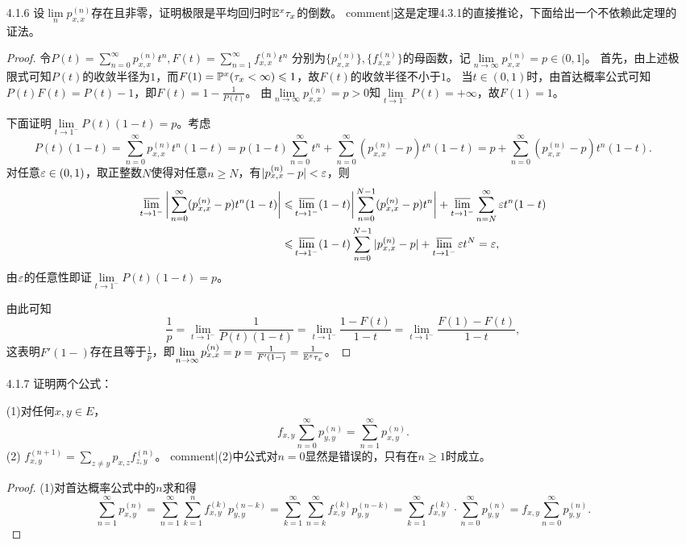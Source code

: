 \begin{enumerate}
\begin{proof}
        必要性：由$x$可达$y$知存在正整数$n$使得$p_{x,y}^{(n)}>0$，而首达概率公式表明
        $\sum\limits_{k=1}^n f_{x,y}^{(k)}p_{y,y}^{(n-k)}=p_{x,y}^{(n)}>0$，
        故存在$1\leqslant k\leqslant n$使得$f_{x,y}^{(k)}>0$，从而$f_{x,y}\geqslant f_{x,y}^{(k)}>0$。
    \end{proof}
    \item[4.1.6] 设$\lim\limits_n p_{x,x}^{(n)}$存在且非零，证明极限是平均回归时$\E^x\tau_x$的倒数。
    {{comment|这是定理4.3.1的直接推论，下面给出一个不依赖此定理的证法。}}
    \begin{proof}
        令$P(t)=\sum\limits_{n=0}^\infty p_{x,x}^{(n)}t^n,F(t)=\sum\limits_{n=1}^\infty f_{x,x}^{(n)}t^n$
        分别为$\{p_{x,x}^{(n)}\},\{f_{x,x}^{(n)}\}$的母函数，记$\lim\limits_{n\to\infty}p_{x,x}^{(n)}=p\in(0,1]$。
        首先，由上述极限式可知$P(t)$的收敛半径为$1$，而$F(1)=\P^x(\tau_x<\infty)\leqslant1$，故$F(t)$的收敛半径不小于$1$。
        当$t\in(0,1)$时，由首达概率公式可知$P(t)F(t)=P(t)-1$，即$F(t)=1-\frac{1}{P(t)}$。
        由$\lim\limits_{n\to\infty}p_{x,x}^{(n)}=p>0$知$\lim\limits_{t\to1^-}P(t)=+\infty$，故$F(1)=1$。

        下面证明$\lim\limits_{t\to1^-}P(t)(1-t)=p$。考虑
        \[P(t)(1-t)=\sum_{n=0}^\infty p_{x,x}^{(n)}t^n(1-t)=p(1-t)\sum_{n=0}^\infty t^n+
        \sum_{n=0}^\infty(p_{x,x}^{(n)}-p)t^n(1-t)=p+\sum_{n=0}^\infty(p_{x,x}^{(n)}-p)t^n(1-t).\]
        对任意$\eps\in(0,1)$，取正整数$N$使得对任意$n\geqslant N$，有$|p_{x,x}^{(n)}-p|<\eps$，则
        \begin{align*}
            \varlimsup_{t\to1^-}\bigg|\sum_{n=0}^\infty(p_{x,x}^{(n)}-p)t^n(1-t)\bigg|\leqslant&
            \varlimsup_{t\to1^-}(1-t)\bigg|\sum_{n=0}^{N-1}(p_{x,x}^{(n)}-p)t^n\bigg|+\varlimsup_{t\to1^-}\sum_{n=N}^\infty\eps t^n(1-t)\\
            \leqslant&\varlimsup_{t\to1^-}(1-t)\sum_{n=0}^{N-1}|p_{x,x}^{(n)}-p|+\varlimsup_{t\to1^-}\eps t^N=\eps,
        \end{align*}
        由$\eps$的任意性即证$\lim\limits_{t\to1^-}P(t)(1-t)=p$。

        由此可知\[\frac{1}{p}=\lim_{t\to1^-}\frac{1}{P(t)(1-t)}=\lim_{t\to1^-}\frac{1-F(t)}{1-t}=\lim_{t\to1^-}\frac{F(1)-F(t)}{1-t},\]
        这表明$F'(1-)$存在且等于$\frac{1}{p}$，即$\lim\limits_{n\to\infty}p_{x,x}^{(n)}=p=\frac{1}{F'(1-)}=\frac{1}{\E^x\tau_x}$。
    \end{proof}
    \item[4.1.7] 证明两个公式：

    (1)对任何$x,y\in E$，\[f_{x,y}\sum_{n=0}^\infty p_{y,y}^{(n)}=\sum_{n=1}^\infty p_{x,y}^{(n)}.\]
    (2) $f_{x,y}^{(n+1)}=\sum\limits_{z\neq y}p_{x,z}f_{z,y}^{(n)}$。
    {{comment|(2)中公式对$n=0$显然是错误的，只有在$n\geqslant1$时成立。}}
    \begin{proof}
        (1)对首达概率公式中的$n$求和得\[\sum_{n=1}^\infty p_{x,y}^{(n)}=\sum_{n=1}^\infty\sum_{k=1}^n f_{x,y}^{(k)}p_{y,y}^{(n-k)}
        =\sum_{k=1}^\infty\sum_{n=k}^\infty f_{x,y}^{(k)}p_{y,y}^{(n-k)}=
        \sum_{k=1}^\infty f_{x,y}^{(k)}\cdot\sum_{n=0}^\infty p_{y,y}^{(n)}=f_{x,y}\sum_{n=0}^\infty p_{y,y}^{(n)}.\]


\end{proof}
\end{enumerate}

